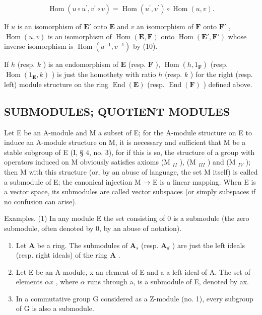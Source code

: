 \[
\operatorname{Hom} \left(u \circ u ^ {\prime}, v ^ {\prime} \circ v\right) = \operatorname{Hom} \left(u ^ {\prime}, v ^ {\prime}\right) \circ \operatorname{Hom} (u, v).\tag{10}
\]

If \(u\) is an isomorphism of \(\mathbf{E}'\) onto \(\mathbf{E}\) and \(v\) an isomorphism of \(\mathbf{F}\) onto \(\mathbf{F}'\) , \(\operatorname{Hom}(u, v)\) is an isomorphism of \(\operatorname{Hom}(\mathbf{E}, \mathbf{F})\) onto \(\operatorname{Hom}(\mathbf{E}', \mathbf{F}')\) whose inverse isomorphism is \(\operatorname{Hom}(u^{-1}, v^{-1})\) by (10).

If \(h\) (resp. \(k\) ) is an endomorphism of \(\mathbf{E}\) (resp. \(\mathbf{F}\) ), \(\operatorname{Hom}(h, 1_{\mathbf{F}})\) (resp. \(\operatorname{Hom}(1_{\mathbf{E}}, k)\) ) is just the homothety with ratio \(h\) (resp. \(k\) ) for the right (resp. left) module structure on the ring \(\operatorname{End}(\mathbf{E})\) (resp. \(\operatorname{End}(\mathbf{F})\) ) defined above.

\subsection{SUBMODULES; QUOTIENT MODULES}

Let E be an A-module and M a subset of E; for the A-module structure on E to induce an A-module structure on M, it is necessary and sufficient that M be a stable subgroup of E (I, § 4, no. 3), for if this is so, the structure of a group with operators induced on M obviously satisfies axioms (M \(_{II}\) ), (M \(_{III}\) ) and (M \(_{IV}\) ); then M with this structure (or, by an abuse of language, the set M itself) is called a submodule of E; the canonical injection M → E is a linear mapping. When E is a vector space, its submodules are called vector subspaces (or simply subspaces if no confusion can arise).

Examples. (1) In any module E the set consisting of 0 is a submodule (the zero submodule, often denoted by 0, by an abuse of notation).

\begin{enumerate}
\def\labelenumi{(\arabic{enumi})}
\setcounter{enumi}{1}
\item
  Let \(\mathbf{A}\) be a ring. The submodules of \(\mathbf{A}_s\) (resp. \(\mathbf{A}_d\) ) are just the left ideals (resp. right ideals) of the ring \(\mathbf{A}\) .
\item
  Let E be an A-module, x an element of E and a a left ideal of A. The set of elements \(\alpha x\) , where \(\alpha\) runs through a, is a submodule of E, denoted by ax.
\item
  In a commutative group G considered as a Z-module (no. 1), every subgroup of G is also a submodule.
\end{enumerate}

